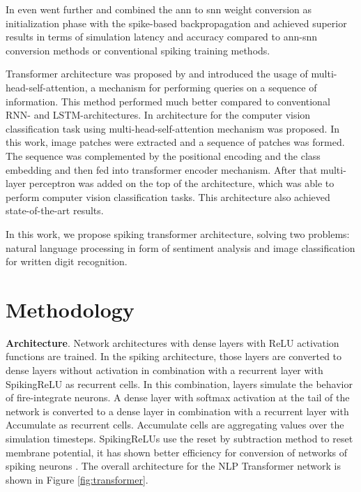 \documentclass{article}
\begin{document}
In \cite{hybrid_conversion} even went further and combined the ann to snn weight conversion as initialization phase with the spike-based backpropagation and achieved superior results in terms of simulation latency and accuracy compared to ann-snn conversion methods or conventional spiking training methods.

Transformer architecture was proposed by \cite{transformer} and introduced the usage of multi-head-self-attention, a mechanism for performing queries on a sequence of information. This method performed much better compared to conventional RNN- and LSTM-architectures. In \cite{vision_transformer} architecture for the computer vision classification task using multi-head-self-attention mechanism was proposed. In this work, image patches were extracted and a sequence of patches was formed. The sequence was complemented by the positional encoding and the class embedding and then fed into transformer encoder mechanism. After that multi-layer perceptron was added on the top of the architecture, which was able to perform computer vision classification tasks. This architecture also achieved state-of-the-art results.

In this work, we propose spiking transformer architecture, solving two problems: natural language processing in form of sentiment analysis and image classification for written digit recognition.

\section{Methodology}
\textbf{Architecture}. Network architectures with dense layers with ReLU activation functions are trained. In the spiking architecture, those layers are converted to dense layers without activation in combination with a recurrent layer with SpikingReLU as recurrent cells. In this combination, layers simulate the behavior of fire-integrate neurons. A dense layer with softmax activation at the tail of the network is converted to a dense layer in combination with a recurrent layer with Accumulate as recurrent cells. Accumulate cells are aggregating values over the simulation timesteps. SpikingReLUs use the reset by subtraction method to reset membrane potential, it has shown better efficiency for conversion of networks of spiking neurons \cite{conversion_continuous_valued}. The overall architecture for the NLP Transformer network is shown in Figure \ref{fig:transformer}.
\end{document}
